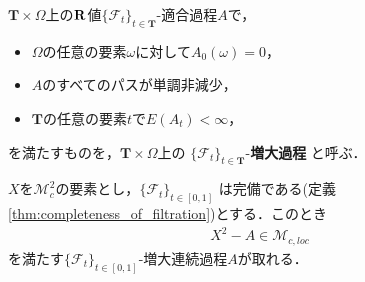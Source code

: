 	\begin{screen}
		\begin{dfn}[増大過程]
			$\mathbf{T} \times \Omega$上の$\mathbf{R}$値$\{\mathscr{F}_t\}_{t \in \mathbf{T}}$-適合過程$A$で，
			\begin{itemize}
				\item $\Omega$の任意の要素$\omega$に対して$A_0(\omega) = 0$，
				\item $A$のすべてのパスが単調非減少，
				\item $\mathbf{T}$の任意の要素$t$で$E(A_t) < \infty$，
			\end{itemize}
			を満たすものを，$\mathbf{T} \times \Omega$上の
			$\{\mathscr{F}_t\}_{t \in \mathbf{T}}$-{\bf 増大過程}
			と呼ぶ．
		\end{dfn}
	\end{screen}
	
	\begin{screen}
		\begin{thm}[局所マルチンゲールの分解]
		\label{thm:decomposition_of_local_martingales}
			$X$を$\mathscr{M}_{c}^{2}$の要素とし，$\{\mathscr{F}_t\}_{t \in [0,1]}$
			は完備である(定義\ref{thm:completeness_of_filtration})とする．このとき
			\begin{align}
				X^2 - A \in \mathscr{M}_{c,loc}
			\end{align}
			を満たす$\{\mathscr{F}_t\}_{t \in [0,1]}$-増大連続過程$A$が取れる．
		\end{thm}
	\end{screen}
	
